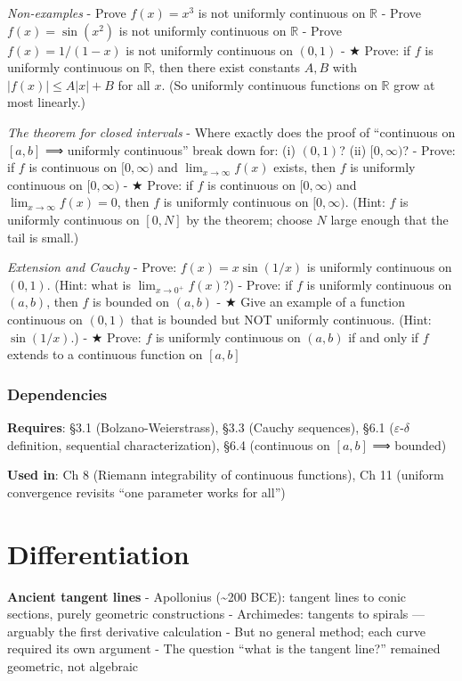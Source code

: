 \documentclass[
  10pt,
  letterpaper,
]{scrbook}
\newcommand{\RR}{\mathbb{R}}
\begin{document}
\emph{Non-examples} - Prove \(f(x) = x^3\) is not uniformly continuous
on \(\RR\) - Prove \(f(x) = \sin(x^2)\) is not uniformly continuous on
\(\RR\) - Prove \(f(x) = 1/(1-x)\) is not uniformly continuous on
\((0, 1)\) - ★ Prove: if \(f\) is uniformly continuous on \(\RR\), then
there exist constants \(A, B\) with \(|f(x)| \leq A|x| + B\) for all
\(x\). (So uniformly continuous functions on \(\RR\) grow at most
linearly.)

\emph{The theorem for closed intervals} - Where exactly does the proof
of ``continuous on \([a,b]\) ⟹ uniformly continuous'' break down for:
(i) \((0, 1)\)? (ii) \([0, \infty)\)? - Prove: if \(f\) is continuous on
\([0, \infty)\) and \(\lim_{x \to \infty} f(x)\) exists, then \(f\) is
uniformly continuous on \([0, \infty)\) - ★ Prove: if \(f\) is
continuous on \([0, \infty)\) and \(\lim_{x \to \infty} f(x) = 0\), then
\(f\) is uniformly continuous on \([0, \infty)\). (Hint: \(f\) is
uniformly continuous on \([0, N]\) by the theorem; choose \(N\) large
enough that the tail is small.)

\emph{Extension and Cauchy} - Prove: \(f(x) = x \sin(1/x)\) is uniformly
continuous on \((0, 1)\). (Hint: what is \(\lim_{x \to 0^+} f(x)\)?) -
Prove: if \(f\) is uniformly continuous on \((a, b)\), then \(f\) is
bounded on \((a, b)\) - ★ Give an example of a function continuous on
\((0,1)\) that is bounded but NOT uniformly continuous. (Hint:
\(\sin(1/x)\).) - ★ Prove: \(f\) is uniformly continuous on \((a,b)\) if
and only if \(f\) extends to a continuous function on \([a,b]\)

\subsection{Dependencies}\label{dependencies-28}

\textbf{Requires}: §3.1 (Bolzano-Weierstrass), §3.3 (Cauchy sequences),
§6.1 (\(\varepsilon\)-\(\delta\) definition, sequential
characterization), §6.4 (continuous on \([a,b]\) ⟹ bounded)

\textbf{Used in}: Ch 8 (Riemann integrability of continuous functions),
Ch 11 (uniform convergence revisits ``one parameter works for all'')

\chapter{Differentiation}\label{differentiation}

\textbf{Ancient tangent lines} - Apollonius (\textasciitilde200 BCE):
tangent lines to conic sections, purely geometric constructions -
Archimedes: tangents to spirals --- arguably the first derivative
calculation - But no general method; each curve required its own
argument - The question ``what is the tangent line?'' remained
geometric, not algebraic
\end{document}
